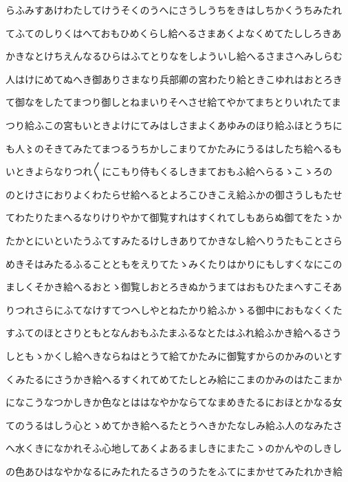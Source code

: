 \documentclass[a4paper,11pt,landscape]{ltjtarticle}
\begin{document}
\par\medskip
らふみすあけわたしてけうそくのうへにさうしうちをきはしちかくうちみたれ
\par\medskip
てふてのしりくはへておもひめくらし給へるさまあくよなくめてたししろきあ
\par\medskip
かきなとけちえんなるひらはふてとりなをしよういし給へるさまさへみしらむ
\par\medskip
人はけにめてぬへき御ありさまなり兵部卿の宮わたり給ときこゆれはおとろき
\par\medskip
て御なをしたてまつり御しとねまいりそへさせ給てやかてまちとりいれたてま
\par\medskip
つり給ふこの宮もいときよけにてみはしさまよくあゆみのほり給ふほとうちに
\par\medskip
も人〻のそきてみたてまつるうちかしこまりてかたみにうるはしたち給へるも
\par\medskip
いときよらなりつれ〱にこもり侍もくるしきまておもふ給へらるゝこゝろの
\par\medskip
のとけさにおりよくわたらせ給へるとよろこひきこえ給ふかの御さうしもたせ
\par\medskip
てわたりたまへるなりけりやかて御覧すれはすくれてしもあらぬ御てをたゝか
\par\medskip
たかとにいといたうふてすみたるけしきありてかきなし給へりうたもことさら
\par\medskip
めきそはみたるふることともをえりてたゝみくたりはかりにもしすくなにこの
\par\medskip
ましくそかき給へるおとゝ御覧しおとろきぬかうまてはおもひたまへすこそあ
\par\medskip
りつれさらにふてなけすてつへしやとねたかり給ふかゝる御中におもなくくた
\par\medskip
すふてのほとさりともとなんおもふたまふるなとたはふれ給ふかき給へるさう
\par\medskip
しともゝかくし給へきならねはとうて給てかたみに御覧すからのかみのいとす
\par\medskip
くみたるにさうかき給へるすくれてめてたしとみ給にこまのかみのはたこまか
\par\medskip
になこうなつかしきか色なとははなやかならてなまめきたるにおほとかなる女
\par\medskip
てのうるはしう心とゝめてかき給へるたとうへきかたなしみ給ふ人のなみたさ
\par\medskip
へ水くきになかれそふ心地してあくよあるましきにまたこゝのかんやのしきし
\par\medskip
の色あひはなやかなるにみたれたるさうのうたをふてにまかせてみたれかき給
\end{document}
